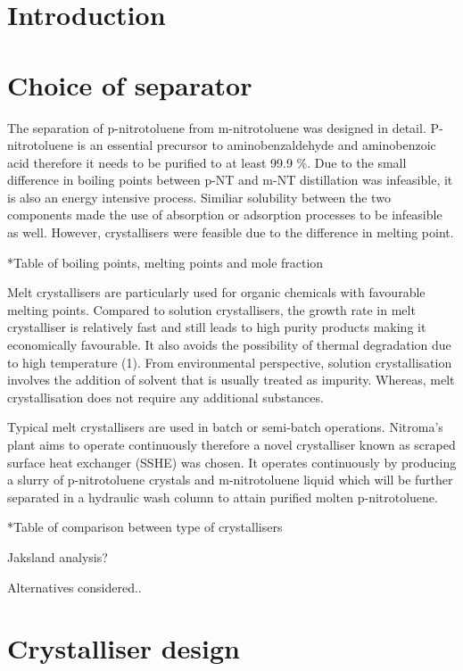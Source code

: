 \section{Introduction}


\section{Choice of separator}
The separation of p-nitrotoluene from m-nitrotoluene was designed in detail. P-nitrotoluene is an essential precursor to aminobenzaldehyde and aminobenzoic acid therefore it needs to be purified to at least 99.9 \%. Due to the small difference in boiling points between p-NT and m-NT distillation was infeasible, it is also an energy intensive process. Similiar solubility between the two components made the use of absorption or adsorption processes to be infeasible as well. However, crystallisers were feasible due to the difference in melting point. 

*Table of boiling points, melting points and mole fraction 

Melt crystallisers are particularly used for organic chemicals with favourable melting points. Compared to solution crystallisers, the growth rate in melt crystalliser is relatively fast and still leads to high purity products making it economically favourable. It also avoids the possibility  of thermal degradation  due to high temperature (1). From environmental perspective, solution crystallisation involves the addition of solvent that is usually treated as impurity. Whereas, melt crystallisation does not require any additional substances. 

Typical melt crystallisers are used in batch or semi-batch operations. Nitroma’s plant aims to operate continuously therefore a novel crystalliser known as scraped surface heat exchanger (SSHE) was chosen. It operates continuously by producing a slurry of p-nitrotoluene crystals and m-nitrotoluene liquid which will be further separated in a hydraulic wash column to attain purified molten p-nitrotoluene. 

*Table of comparison between type of crystallisers

 
Jaksland analysis?

Alternatives considered..



\section{Crystalliser design}





